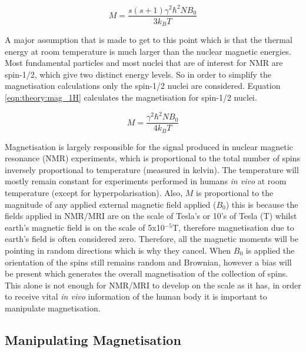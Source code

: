 \documentclass[class=article, crop=false]{standalone}
\begin{document}
\begin{equation}
    M = \frac{s(s+1)\gamma^2 \hbar^2 N B_0}{3k_BT}
    \label{eqn:theory:mag_s}
\end{equation}

A major assumption that is made to get to this point which is that the thermal energy at room temperature is much larger than the nuclear magnetic energies. Most fundamental particles and most nuclei that are of interest for NMR are spin-1/2, which give two distinct energy levels. So in order to simplify the magnetisation calculations only the spin-1/2 nuclei are considered. Equation \ref{eqn:theory:mag_1H} calculates the magnetisation for spin-1/2 nuclei.

\begin{equation}
    M = \frac{\gamma^2 \hbar^2 N B_0}{4k_BT}
    \label{eqn:theory:mag_1H}
\end{equation}

Magnetisation is largely responsible for the signal produced in nuclear magnetic resonance (NMR) experiments, which is proportional to the total number of spins inversely proportional to temperature (measured in kelvin). The temperature will mostly remain constant for experiments performed in humans \textit{in vivo} at room temperature (except for hyperpolarisation). Also, $M$ is proportional to the magnitude of any applied external magnetic field applied ($B_0$) this is because the fields applied in NMR/MRI are on the scale of Tesla's or 10's of Tesla (T) whilst earth's magnetic field is on the scale of 5x10$^{-5}$T, therefore magnetisation due to earth's field is often considered zero. Therefore, all the magnetic moments will be pointing in random directions which is why they cancel. When $B_0$ is applied the orientation of the spins still remains random and Brownian, however a bias will be present which generates the overall magnetisation of the collection of spins. This alone is not enough for NMR/MRI to develop on the scale as it has, in order to receive vital \textit{in vivo} information of the human body it is important to manipulate magnetisation\cite{Haacke2014MagneticDesign}. 

\subsection{Manipulating Magnetisation}
\end{document}
